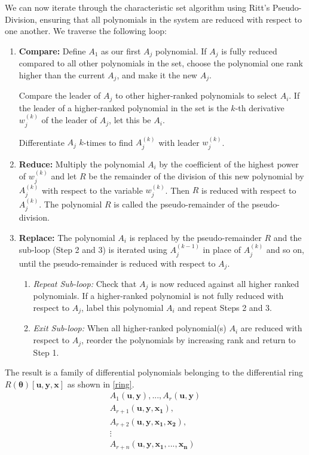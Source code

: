 \documentclass[a4paper,fleqn]{cas-dc}
\theoremstyle{definition}
\begin{document}
We can now iterate through the characteristic set algorithm using Ritt's Pseudo-Division, ensuring that all polynomials in the system are reduced with respect to one another.
We traverse the following loop:
\begin{enumerate}
    \item \textbf{Compare:} Define $A_1$ as our first $A_j$ polynomial. If $A_j$ is fully reduced compared to all other polynomials in the set, choose the polynomial one rank higher than the current $A_j$, and make it the new $A_j$.

    Compare the leader of $A_j$ to other higher-ranked polynomials to select $A_i$.
    If the leader of a higher-ranked polynomial in the set is the $k$-th derivative $w_j^{(k)}$ of the leader of $A_j$, let this be $A_i$. 
    
    Differentiate $A_j$ $k$-times to find $A_j^{(k)}$ with leader $w_j^{(k)}$.
    
    \item \textbf{Reduce:} Multiply the polynomial $A_i$ by the coefficient of the highest power of $w_j^{(k)}$ and let $R$ be the remainder of the division of this new polynomial by $A_j^{(k)}$ with respect to the variable $w_j^{(k)}$. Then $R$ is reduced with respect to $A_j^{(k)}$. The polynomial $R$ is called the pseudo-remainder of the pseudo-division.
    \item \textbf{Replace:} The polynomial $A_i$ is replaced by the pseudo-remainder $R$ and the sub-loop (Step 2 and 3) is iterated using $A_j^{(k-1)}$ in place of $A_j^{(k)}$ and so on, until the pseudo-remainder is reduced with respect to $A_j$.
    \begin{enumerate}
        \item \textit{Repeat Sub-loop:} Check that $A_j$ is now reduced against all higher ranked polynomials. If a higher-ranked polynomial is not fully reduced with respect to $A_j$, label this polynomial $A_i$ and repeat Steps 2 and 3.
        \item \textit{Exit Sub-loop:} When all higher-ranked polynomial(s) $A_i$ are reduced with respect to $A_j$, reorder the polynomials by increasing rank and return to Step 1.
    \end{enumerate}
\end{enumerate}
The result is a family of differential polynomials belonging to the differential ring $R(\pmb{\theta})[\pmb{u},\pmb{y},\pmb{x}]$ as shown in \cref{ring}.
\begin{align} \label{ring}
    A_1(\mathbf{u},\mathbf{y}), ..., A_r(\mathbf{u},\mathbf{y}) \\ \nonumber
    A_{r+1}(\mathbf{u},\mathbf{y},\mathbf{x_1}), \\ \nonumber
    A_{r+2}(\mathbf{u},\mathbf{y},\mathbf{x_1}, \mathbf{x_2}), \\ \nonumber
    \vdots ~~~~~~~~~\\ \nonumber
    A_{r+n}(\mathbf{u},\mathbf{y},\mathbf{x_1}, ..., \mathbf{x_n})
\end{align}
\end{document}
